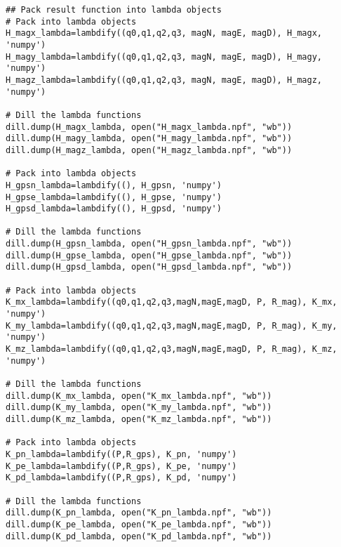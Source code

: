 \begin{verbatim}
## Pack result function into lambda objects
# Pack into lambda objects
H_magx_lambda=lambdify((q0,q1,q2,q3, magN, magE, magD), H_magx, 'numpy')
H_magy_lambda=lambdify((q0,q1,q2,q3, magN, magE, magD), H_magy, 'numpy')
H_magz_lambda=lambdify((q0,q1,q2,q3, magN, magE, magD), H_magz, 'numpy')

# Dill the lambda functions
dill.dump(H_magx_lambda, open("H_magx_lambda.npf", "wb"))
dill.dump(H_magy_lambda, open("H_magy_lambda.npf", "wb"))
dill.dump(H_magz_lambda, open("H_magz_lambda.npf", "wb"))

# Pack into lambda objects
H_gpsn_lambda=lambdify((), H_gpsn, 'numpy')
H_gpse_lambda=lambdify((), H_gpse, 'numpy')
H_gpsd_lambda=lambdify((), H_gpsd, 'numpy')

# Dill the lambda functions
dill.dump(H_gpsn_lambda, open("H_gpsn_lambda.npf", "wb"))
dill.dump(H_gpse_lambda, open("H_gpse_lambda.npf", "wb"))
dill.dump(H_gpsd_lambda, open("H_gpsd_lambda.npf", "wb"))

# Pack into lambda objects
K_mx_lambda=lambdify((q0,q1,q2,q3,magN,magE,magD, P, R_mag), K_mx, 'numpy')
K_my_lambda=lambdify((q0,q1,q2,q3,magN,magE,magD, P, R_mag), K_my, 'numpy')
K_mz_lambda=lambdify((q0,q1,q2,q3,magN,magE,magD, P, R_mag), K_mz, 'numpy')

# Dill the lambda functions
dill.dump(K_mx_lambda, open("K_mx_lambda.npf", "wb"))
dill.dump(K_my_lambda, open("K_my_lambda.npf", "wb"))
dill.dump(K_mz_lambda, open("K_mz_lambda.npf", "wb"))

# Pack into lambda objects
K_pn_lambda=lambdify((P,R_gps), K_pn, 'numpy')
K_pe_lambda=lambdify((P,R_gps), K_pe, 'numpy')
K_pd_lambda=lambdify((P,R_gps), K_pd, 'numpy')

# Dill the lambda functions
dill.dump(K_pn_lambda, open("K_pn_lambda.npf", "wb"))
dill.dump(K_pe_lambda, open("K_pe_lambda.npf", "wb"))
dill.dump(K_pd_lambda, open("K_pd_lambda.npf", "wb"))
\end{verbatim}